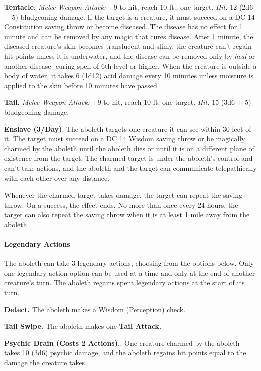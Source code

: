 \documentclass[
]{article}
\begin{document}
\textbf{Tentacle.} \emph{Melee Weapon Attack:} +9 to hit, reach 10 ft.,
one target. \emph{Hit:} 12 (2d6 + 5) bludgeoning damage. If the target
is a creature, it must succeed on a DC 14 Constitution saving throw or
become diseased. The disease has no effect for 1 minute and can be
removed by any magic that cures disease. After 1 minute, the diseased
creature's skin becomes translucent and slimy, the creature can't regain
hit points unless it is underwater, and the disease can be removed only
by \emph{heal} or another disease-­‐curing spell of 6th level or higher.
When the creature is outside a body of water, it takes 6 (1d12) acid
damage every 10 minutes unless moisture is applied to the skin before 10
minutes have passed.

\textbf{Tail.} \emph{Melee Weapon Attack:} +9 to hit, reach 10 ft. one
target. \emph{Hit:} 15 (3d6 + 5) bludgeoning damage.

\textbf{Enslave (3/Day)}. The aboleth targets one creature it can see
within 30 feet of it. The target must succeed on a DC 14 Wisdom saving
throw or be magically charmed by the aboleth until the aboleth dies or
until it is on a different plane of existence from the target. The
charmed target is under the aboleth's control and can't take actions,
and the aboleth and the target can communicate telepathically with each
other over any distance.

Whenever the charmed target takes damage, the target can repeat the
saving throw. On a success, the effect ends. No more than once every 24
hours, the target can also repeat the saving throw when it is at least 1
mile away from the aboleth.

\hypertarget{legendary-actions}{%
\paragraph{Legendary Actions}\label{legendary-actions}}

The aboleth can take 3 legendary actions, choosing from the options
below. Only one legendary action option can be used at a time and only
at the end of another creature's turn. The aboleth regains spent
legendary actions at the start of its turn.

\textbf{Detect.} The aboleth makes a Wisdom (Perception) check.

\textbf{Tail Swipe.} The aboleth makes one \textbf{Tail Attack.}

\textbf{Psychic Drain (Costs 2 Actions).}. One creature charmed by the
aboleth takes 10 (3d6) psychic damage, and the aboleth regains hit
points equal to the damage the creature takes.
\end{document}
